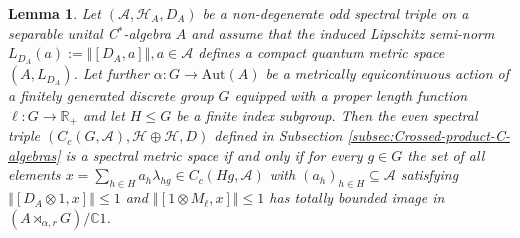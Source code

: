 \documentclass[a4paper,11pt,reqno]{amsart}
\numberwithin{equation}{section}
\numberwithin{equation}{section}
\newtheorem{lemma}[theorem]{Lemma}
\theoremstyle{definition}
\theoremstyle{remark}
\theoremstyle{remark}
\begin{document}
\begin{lemma} \label{FiniteIndex} Let $(\mathcal{A},\mathcal{H}_{A},D_{A})$
be a non-degenerate odd spectral triple on a separable unital C$^{\ast}$-algebra
$A$ and assume that the induced Lipschitz semi-norm $L_{D_{A}}(a):=\left\Vert [D_{A},a]\right\Vert ,a\in\mathcal{A}$
defines a compact quantum metric space $(A,L_{D_{A}})$. Let further
$\alpha:G\rightarrow\text{Aut}(A)$ be a metrically equicontinuous
action of a finitely generated discrete group $G$ equipped with a
proper length function $\ell:G\rightarrow\mathbb{R}_{+}$ and let
$H\leq G$ be a finite index subgroup. Then the even spectral triple
$(C_{c}(G,\mathcal{A}),\mathcal{H}\oplus\mathcal{H},D)$ defined in
Subsection \ref{subsec:Crossed-product-C-algebras} is a spectral metric space
if and only if for every $g\in G$ the set of
all elements $x=\sum_{h\in H}a_{h}\lambda_{hg}\in C_{c}(Hg,\mathcal{A})$
with $(a_{h})_{h\in H}\subseteq\mathcal{A}$ satisfying $\left\Vert [D_{A}\otimes1,x]\right\Vert \leq1$
and $\left\Vert [1\otimes M_{\ell},x]\right\Vert \leq1$ has totally
bounded image in $(A\rtimes_{\alpha,r}G)/\mathbb{C}1$. \end{lemma}
\end{document}
